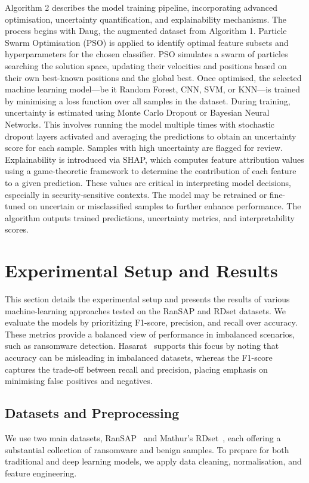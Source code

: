 Algorithm 2 describes the model training pipeline, incorporating advanced optimisation, uncertainty quantification, and explainability mechanisms. The process begins with Daug, the augmented dataset from Algorithm 1. Particle Swarm Optimisation (PSO) is applied to identify optimal feature subsets and hyperparameters for the chosen classifier. PSO simulates a swarm of particles searching the solution space, updating their velocities and positions based on their own best-known positions and the global best. Once optimised, the selected machine learning model—be it Random Forest, CNN, SVM, or KNN—is trained by minimising a loss function over all samples in the dataset. During training, uncertainty is estimated using Monte Carlo Dropout or Bayesian Neural Networks. This involves running the model multiple times with stochastic dropout layers activated and averaging the predictions to obtain an uncertainty score for each sample. Samples with high uncertainty are flagged for review. Explainability is introduced via SHAP, which computes feature attribution values using a game-theoretic framework to determine the contribution of each feature to a given prediction. These values are critical in interpreting model decisions, especially in security-sensitive contexts. The model may be retrained or fine-tuned on uncertain or misclassified samples to further enhance performance. The algorithm outputs trained predictions, uncertainty metrics, and interpretability scores.

\section{Experimental Setup and Results}
\label{sec:Results}

This section details the experimental setup and presents the results of various machine-learning approaches tested on the RanSAP and RDset datasets. We evaluate the models by prioritizing F1-score, precision, and recall over accuracy. These metrics provide a balanced  view of performance in imbalanced scenarios, such as ransomware detection. Hasarat~\cite{Hasarat2024} supports this focus by noting that accuracy can be misleading in imbalanced datasets, whereas the F1-score captures the trade-off between recall and precision, placing emphasis on minimising false positives and negatives.

\subsection{Datasets and Preprocessing}
We use two main datasets, RanSAP~\cite{hirano2022ransap} and Mathur's RDset~\cite{mathur2020ransomware}, each offering a substantial collection of ransomware and benign samples. To prepare  for both traditional and deep learning models, we apply data cleaning, normalisation, and feature engineering.

